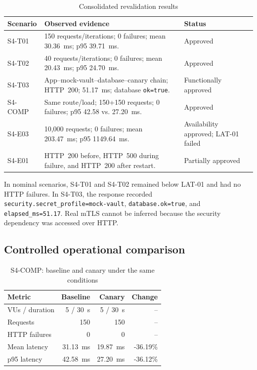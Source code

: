 \documentclass[12pt]{article}
\begin{document}
\begin{table}[ht]
\centering
\caption{Consolidated revalidation results}
\label{tab:main-results-en}
\small
\begin{tabularx}{\textwidth}{p{}Yp{0.20\textwidth}}
\toprule
\textbf{Scenario} & \textbf{Observed evidence} & \textbf{Status} \\
\midrule
S4-T01 & 150 requests/iterations; 0 failures; mean 30.36~ms; p95 39.71~ms. & Approved \\
S4-T02 & 40 requests/iterations; 0 failures; mean 20.43~ms; p95 24.70~ms. & Approved \\
S4-T03 & App--mock-vault--database--canary chain; HTTP~200; 51.17~ms; database \texttt{ok=true}. & Functionally approved \\
S4-COMP & Same route/load; 150+150 requests; 0 failures; p95 42.58 vs. 27.20~ms. & Approved \\
S4-E03 & 10,000 requests; 0 failures; mean 203.47~ms; p95 1149.64~ms. & Availability approved; LAT-01 failed \\
S4-E01 & HTTP~200 before, HTTP~500 during failure, and HTTP~200 after restart. & Partially approved \\
\bottomrule
\end{tabularx}
\end{table}

In nominal scenarios, S4-T01 and S4-T02 remained below LAT-01 and had no HTTP failures. In S4-T03, the response recorded \texttt{security.secret\_profile=mock-vault}, \texttt{database.ok=true}, and \texttt{elapsed\_ms=51.17}. Real mTLS cannot be inferred because the security dependency was accessed over HTTP.

\subsection{Controlled operational comparison}
\begin{table}[ht]
\centering
\caption{S4-COMP: baseline and canary under the same conditions}
\label{tab:comp-en}
\small
\begin{tabularx}{\textwidth}{Yrrr}
\toprule
\textbf{Metric} & \textbf{Baseline} & \textbf{Canary} & \textbf{Change} \\
\midrule
VUs / duration & 5 / 30~s & 5 / 30~s & -- \\
Requests & 150 & 150 & -- \\
HTTP failures & 0 & 0 & -- \\
Mean latency & 31.13~ms & 19.87~ms & -36.19\% \\
p95 latency & 42.58~ms & 27.20~ms & -36.12\% \\
\bottomrule
\end{tabularx}
\end{table}
\end{document}
